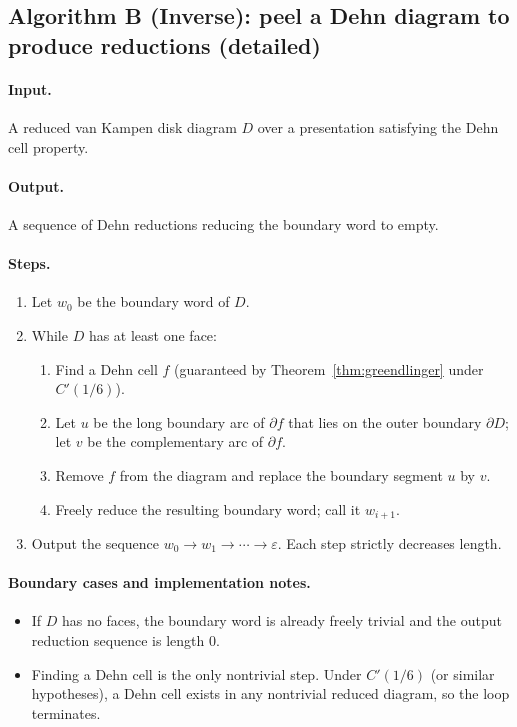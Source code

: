 \documentclass[11pt]{article}
\theoremstyle{definition}
\theoremstyle{plain}
\theoremstyle{remark}
\begin{document}
\subsection*{Algorithm B (Inverse): peel a Dehn diagram to produce reductions (detailed)}\cite{dehn1911,greendlinger1960,lyndonschupp1977}
\paragraph{Input.} A reduced van Kampen disk diagram $D$ over a presentation satisfying the Dehn cell property.
\paragraph{Output.} A sequence of Dehn reductions reducing the boundary word to empty.

\paragraph{Steps.}
\begin{enumerate}[leftmargin=2.2em]
\item Let $w_0$ be the boundary word of $D$.
\item While $D$ has at least one face:
\begin{enumerate}[leftmargin=2em]
\item Find a Dehn cell $f$ (guaranteed by Theorem~\ref{thm:greendlinger} under $C'(1/6)$).
\item Let $u$ be the long boundary arc of $\partial f$ that lies on the outer boundary $\partial D$; let $v$ be the complementary arc of $\partial f$.
\item Remove $f$ from the diagram and replace the boundary segment $u$ by $v$.
\item Freely reduce the resulting boundary word; call it $w_{i+1}$.
\end{enumerate}
\item Output the sequence $w_0\to w_1\to\cdots\to \varepsilon$.
Each step strictly decreases length.
\end{enumerate}



\paragraph{Boundary cases and implementation notes.}
\begin{itemize}[leftmargin=2em]
\item If $D$ has no faces, the boundary word is already freely trivial and the output reduction sequence is length $0$.
\item Finding a Dehn cell is the only nontrivial step. Under $C'(1/6)$ (or similar hypotheses), a Dehn cell exists in any nontrivial reduced diagram, so the loop terminates.
\end{itemize}
\end{document}
